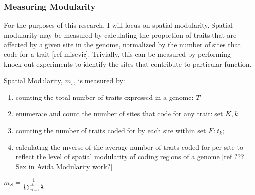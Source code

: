 \subsubsection{Measuring Modularity}

For the purposes of this research, I will focus on spatial modularity. Spatial modularity may be measured by calculating the proportion of traits that are affected by a given site in the genome, normalized by the number of sites that code for a trait [ref misevic]. Trivially, this can be measured by performing knock-out experiments to identify the sites that contribute to particular function.

Spatial Modularity, $m_s$, is measured by:

\begin{enumerate}
\item counting the total number of traits expressed in a genome: $T$
\item enumerate and count the number of sites that code for any trait: set $K, k$
\item counting the number of traits coded for by each site within set $K: t_k$;
\item calculating the inverse of the average number of traits coded for per site to reflect the level of spatial modularity of coding regions of a genome [ref ??? Sex in Avida Modularity work?]
\end{enumerate}

$m_{S} =  \frac{1}{\frac{1}{k} {\sum_{i=1}^{k} \frac{t_{k}}{T}}}$ 


